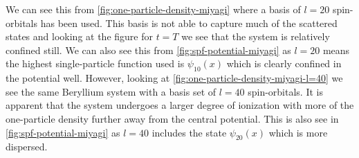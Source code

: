         We can see this from \autoref{fig:one-particle-density-miyagi}
        where a basis of $l = 20$ spin-orbitals has been used.
        This basis is not able to capture much of the scattered states and
        looking at the figure for $t = T$ we see that the system is
        relatively confined still.
        We can also see this from \autoref{fig:spf-potential-miyagi} as $l =
        20$ means the highest single-particle function used is
        $\psi_{10}(x)$ which is clearly confined in the potential well.
        However, looking at \autoref{fig:one-particle-density-miyagi-l=40}
        we see the same Beryllium system with a basis set of $l = 40$
        spin-orbitals.
        It is apparent that the system undergoes a larger degree of
        ionization with more of the one-particle density further away from
        the central potential.
        This is also see in \autoref{fig:spf-potential-miyagi} as $l = 40$
        includes the state $\psi_{20}(x)$ which is more dispersed.


